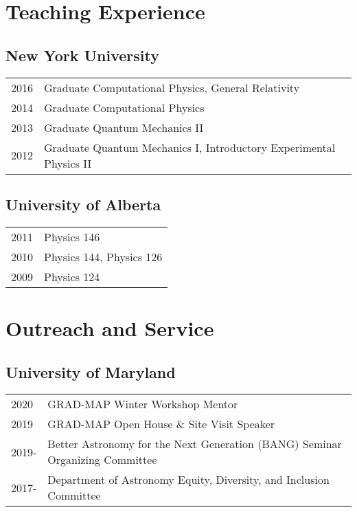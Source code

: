\documentclass[letterpaper]{article}
\renewenvironment{itemize}{
  \begin{list}{}{
    \setlength{\leftmargin}{1.5em}
  }
}{
  \end{list}
}
\begin{document}
\begin{itemize}
\end{itemize}

\section*{Teaching Experience}
\subsection*{New York University}
\begin{itemize}
\item \begin{tabular}{ll}
2016 & Graduate Computational Physics, General Relativity \\
2014 & Graduate Computational Physics \\
2013 & Graduate Quantum Mechanics II \\
2012 & Graduate Quantum Mechanics I, Introductory Experimental Physics II
\end{tabular}
\end{itemize}
\subsection*{University of Alberta}
\begin{itemize}
\item \begin{tabular}{ll}
2011 & Physics 146 \\
2010 & Physics 144, Physics 126 \\
2009 & Physics 124 \\
\end{tabular}
\end{itemize}

\section*{Outreach and Service}
\subsection*{University of Maryland}
\begin{itemize}
\item \begin{tabular}{ll}
2020		& GRAD-MAP Winter Workshop Mentor \\
2019		& GRAD-MAP Open House \& Site Visit Speaker \\
2019-	& Better Astronomy for the Next Generation (BANG) Seminar Organizing Committee \\
2017- 	& Department of Astronomy Equity, Diversity, and Inclusion Committee
\end{tabular}
\end{itemize}
\end{document}
